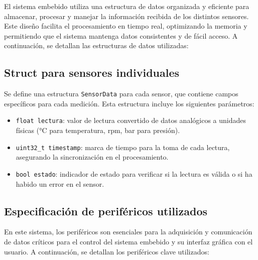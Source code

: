 El sistema embebido utiliza una estructura de datos organizada y eficiente para almacenar, procesar y manejar la información recibida de los distintos sensores. Este diseño facilita el procesamiento en tiempo real, optimizando la memoria y permitiendo que el sistema mantenga datos consistentes y de fácil acceso. A continuación, se detallan las estructuras de datos utilizadas:

\subsection{Struct para sensores individuales}

Se define una estructura \texttt{SensorData} para cada sensor, que contiene campos específicos para cada medición. Esta estructura incluye los siguientes parámetros:

\begin{itemize}
    \item \texttt{float lectura}: valor de lectura convertido de datos analógicos a unidades físicas (°C para temperatura, rpm, bar para presión).
    \item \texttt{uint32\_t timestamp}: marca de tiempo para la toma de cada lectura, asegurando la sincronización en el procesamiento.
    \item \texttt{bool estado}: indicador de estado para verificar si la lectura es válida o si ha habido un error en el sensor.
\end{itemize}

\subsection{Especificación de periféricos utilizados}

En este sistema, los periféricos son esenciales para la adquisición y comunicación de datos críticos para el control del sistema embebido y su interfaz gráfica con el usuario. A continuación, se detallan los periféricos clave utilizados:

